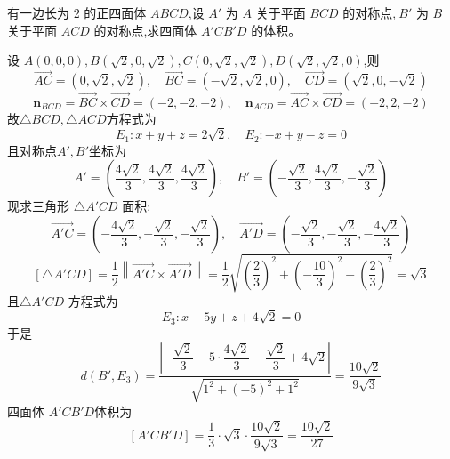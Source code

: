 \begin{questions}
    \question 有一边长为 2 的正四面体 $ABCD$,设 $A'$ 为 $A$ 关于平面 $BCD$ 的对称点,$\ B'$ 为 $B$ 关于平面 $ACD$ 的对称点,求四面体 $A'CB'D$ 的体积。
    \begin{solution}
        设 $A(0,0,0),B(\sqrt{2}, 0, \sqrt{2}),C(0, \sqrt{2}, \sqrt{2}),D(\sqrt{2}, \sqrt{2}, 0)$,则
        \[
        \overrightarrow{AC}=(0, \sqrt{2}, \sqrt{2}),\quad \overrightarrow{BC}=(−\sqrt{2},\sqrt{2},0),\quad \overrightarrow{CD}=(\sqrt{2},0,−\sqrt{2})
        \]
        \[
        \textbf{n}_{BCD}=\overrightarrow{BC}\times\overrightarrow{CD}=(−2,−2,−2),\quad \textbf{n}_{ACD}=\overrightarrow{AC}\times\overrightarrow{CD}=(−2,2,−2)
        \]
        故$\triangle BCD,\triangle ACD$方程式为
        \[
        E_1 :  x + y + z = 2\sqrt{2},\quad E_2 : -x + y - z = 0
        \]
        且对称点$A',B'$坐标为
        \[
        A' = \left( \dfrac{4\sqrt{2}}{3} , \dfrac{4\sqrt{2}}{3} , \dfrac{4\sqrt{2}}{3}  \right),\quad
        B' = \left( -\dfrac{\sqrt{2}}{3}, \dfrac{4\sqrt{2}}{3} , -\dfrac{\sqrt{2}}{3} \right)
        \]
        现求三角形 $\triangle A'CD$ 面积:
        \[
        \vec{A'C} = \left( -\dfrac{4\sqrt{2}}{3} , -\dfrac{\sqrt{2}}{3}, -\dfrac{\sqrt{2}}{3} \right) ,\quad
        \vec{A'D} = \left( -\dfrac{\sqrt{2}}{3} , -\dfrac{\sqrt{2}}{3}, -\dfrac{4\sqrt{2}}{3}  \right) 
        \]
        \[
        [\triangle A'CD]=\dfrac{1}{2} \left\lVert \vec{A'C} \times \vec{A'D} \right\rVert = \dfrac{1}{2} \sqrt{ \left( \dfrac{2}{3} \right)^2 + \left( -\dfrac{10}{3} \right)^2 + \left( \dfrac{2}{3} \right)^2 } = \sqrt{3}
        \]
        且$\triangle A'CD$ 方程式为
        \[
        E_3 : x - 5y + z + 4\sqrt{2} = 0
        \]
        于是
        \[
        d(B', E_3) = \dfrac{ \left| -\dfrac{\sqrt{2}}{3}  - 5 \cdot \dfrac{4\sqrt{2}}{3}  - \dfrac{\sqrt{2}}{3}  + 4\sqrt{2} \right| }{ \sqrt{1^2 + (-5)^2 + 1^2} }
        = \dfrac{10\sqrt{2}}{9\sqrt{3}}
        \]
        四面体 $A'CB'D$体积为
        \[
        [A'CB'D]=\dfrac{1}{3} \cdot \sqrt{3} \cdot \dfrac{10\sqrt{2}}{9\sqrt{3}} =  \dfrac{10\sqrt{2}}{27}
        \]
    \end{solution}


\end{questions}
